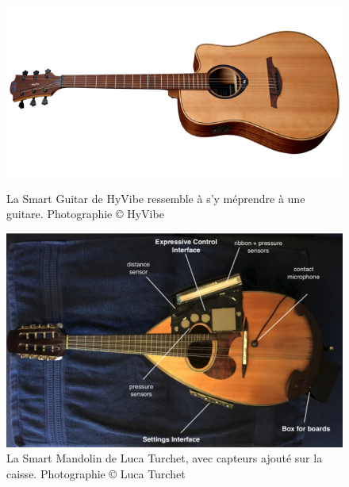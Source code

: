 \begin{figure}[!htbp]
	\captionsetup{format=plain}%
	\centering
	\begin{minipage}[t]{0.48\textwidth}
		\includegraphics[width=\linewidth]{gfx/05_interfaces/HyVibe-guitar.png}
		\caption[La Smart Guitar de HyVibe]{La Smart Guitar de HyVibe ressemble à s'y méprendre à une guitare. Photographie © HyVibe}
		\label{fig:interface:hyvibe}
	\end{minipage}
	\hspace{.02\linewidth}
	\begin{minipage}[t]{0.48\textwidth}
	    \includegraphics[width=\linewidth]{gfx/05_interfaces/Turchet-SmartMandolin.png}
		\caption[La Smart Mandolin de Luca Turchet]{La Smart Mandolin de Luca Turchet, avec capteurs ajouté sur la caisse. Photographie © Luca Turchet}
		\label{fig:interface:smart-mandolin}
	\end{minipage}
\end{figure}
